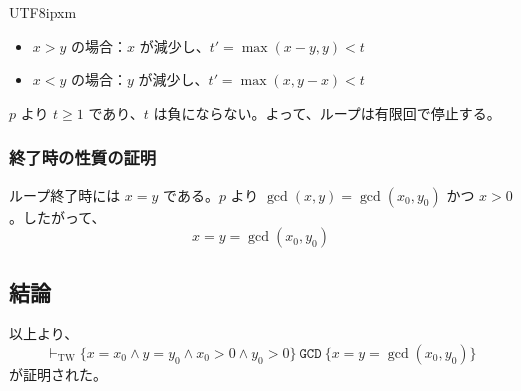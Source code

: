 \documentclass[12pt,a4paper]{article}
\begin{document}
\begin{CJK}{UTF8}{ipxm}
\begin{itemize}
    \item $x > y$ の場合：$x$ が減少し、$t' = \max(x - y, y) < t$
    \item $x < y$ の場合：$y$ が減少し、$t' = \max(x, y - x) < t$
\end{itemize}

$p$ より $t \geq 1$ であり、$t$ は負にならない。よって、ループは有限回で停止する。

\subsubsection*{終了時の性質の証明}

ループ終了時には $x = y$ である。$p$ より $\gcd(x, y) = \gcd(x_0, y_0)$ かつ $x > 0$。したがって、
\[
x = y = \gcd(x_0, y_0)
\]

\subsection*{結論}

以上より、
\[
\vdash_{\text{TW}} \{ x = x_0 \land y = y_0 \land x_0 > 0 \land y_0 > 0 \} \ \texttt{GCD} \ \{ x = y = \gcd(x_0, y_0) \}
\]
が証明された。

\end{CJK}
\end{document}
